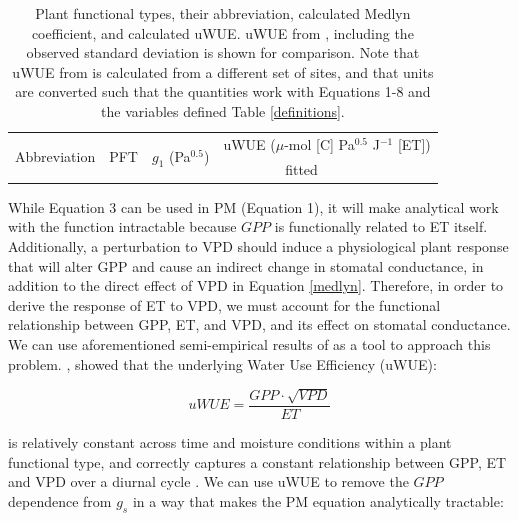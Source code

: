 \documentclass[draft,linenumbers]{agujournal}
\begin{document}
\begin{table}
  \caption{Plant functional types, their abbreviation, calculated
    Medlyn coefficient, and calculated uWUE. uWUE from
    \citet{Zhou_2015}, including the observed standard deviation is
    shown for comparison. Note that uWUE from \citet{Zhou_2015} is
    calculated from a different set of sites, and that units are
    converted such that the quantities work with Equations 1-8 and the
    variables defined Table \ref{definitions}.}
  \small
  \label{pft}
  \centering
  \begin{tabular}{l c c @{\qquad} c c}
    \hline
    \multirow{2}[3]{*}{Abbreviation} & \multirow{2}[3]{*}{PFT} & \multirow{2}[3]{*}{$g_1$ (Pa$^{0.5}$)} & \multicolumn{2}{c}{uWUE ($\mu$-mol [C] Pa$^{0.5}$ J$^{-1}$ [ET])}  \\
    \cmidrule{4-5}

                                     & & & fitted & \citet{Zhou_2015} \\

    \hline
    
    \hline
  \end{tabular}
\end{table}

While Equation 3 can be used in PM (Equation 1), it will make
analytical work with the function intractable because $GPP$ is
functionally related to ET itself. Additionally, a perturbation to VPD
should induce a physiological plant response that will alter GPP and
cause an indirect change in stomatal conductance, in addition to the
direct effect of VPD in Equation \ref{medlyn}. Therefore, in order to
derive the response of ET to VPD, we must account for the functional
relationship between GPP, ET, and VPD, and its effect on stomatal
conductance. We can use aforementioned semi-empirical results of
\citet{Zhou_2015} as a tool to approach this
problem. \citet{Zhou_2015}, showed that the underlying Water Use
Efficiency (uWUE):

\begin{linenomath*}
  \begin{equation}
    uWUE = \frac{GPP \cdot \sqrt{VPD}}{ET}
    \label{uwue}
  \end{equation}
\end{linenomath*}

is relatively constant across time and moisture conditions within a
plant functional type, and correctly captures a constant relationship
between GPP, ET and VPD over a diurnal cycle \citep{Zhou_2014}. We can
use uWUE to remove the $GPP$ dependence from $g_s$ in a way that makes
the PM equation analytically tractable:
\end{document}
